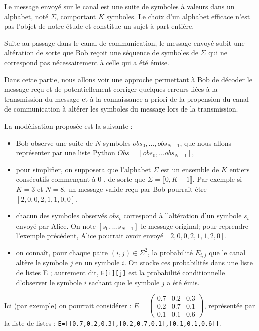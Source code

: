 Le message envoyé sur le canal est une suite de symboles à valeurs dans un alphabet, noté $\Sigma$, comportant $K$ symboles. Le choix d'un alphabet efficace n'est pas l'objet de notre étude et constitue un sujet à part entière.

Suite au passage dans le canal de communication, le message envoyé subit une altération de sorte que Bob reçoit une séquence de symboles de $\Sigma$ qui ne correspond pas nécessairement à celle qui a été émise.

Dans cette partie, nous allons voir une approche permettant à Bob de décoder le message reçu et de potentiellement corriger quelques erreurs liées à la transmission du message et à la connaissance a priori de la propension du canal de communication à altérer les symboles du message lors de la transmission.

La modélisation proposée est la suivante :

\begin{itemize}
  \item Bob observe une suite de $N$ symboles $o b s_{0}, \ldots, o b s_{N-1}$, que nous allons représenter par une liste Python $O b s=\left[o b s_{0}, \ldots o b s_{N-1}\right]$,
  \item pour simplifier, on supposera que l'alphabet $\Sigma$ est un ensemble de $K$ entiers consécutifs commençant à 0 , de sorte que $\Sigma=\llbracket 0, K-1 \rrbracket$. Par exemple si $K=3$ et $N=8$, un message valide reçu par Bob pourrait être $[2,0,0,2,1,1,0,0]$.
  \item chacun des symboles observés $o b s_{t}$ correspond à l'altération d'un symbole $s_{t}$ envoyé par Alice. On note $\left[s_{0}, \ldots s_{N-1}\right]$ le message original; pour reprendre l'exemple précédent, Alice pourrait avoir envoyé $[2,0,0,2,1,1,2,0]$.
  \item on connaît, pour chaque paire $(i, j) \in \Sigma^{2}$, la probabilité $E_{i, j}$ que le canal altère le symbole $j$ en un symbole $i$. On stocke ces probabilités dans une liste de listes E ; autrement dit, \lstinline{E[i][j]} est la probabilité conditionnelle d'observer le symbole $i$ sachant que le symbole $j$ a été émis.
\end{itemize}

Ici (par exemple) on pourrait considérer : $E=\left(\begin{array}{ccc}0.7 & 0.2 & 0.3 \\ 0.2 & 0.7 & 0.1 \\ 0.1 & 0.1 & 0.6\end{array}\right)$, représentée par la liste de listes : \lstinline{E=[[0.7,0.2,0.3],[0.2,0.7,0.1],[0.1,0.1,0.6]]}.

